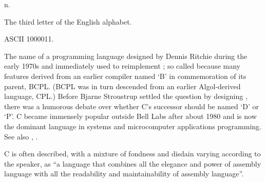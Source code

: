  n.

\begin{inparaenum}
\item The third letter of the English alphabet.
\item ASCII 1000011.
\item The name of a programming language designed by Dennis Ritchie during the
    early 1970s and immediately used to reimplement ; so called
    because many features derived from an earlier compiler named `B' in
    commemoration of its parent, BCPL. (BCPL was in turn descended from an
    earlier Algol-derived language, CPL.) Before Bjarne Stroustrup settled the
    question by designing , there was a humorous debate over
    whether C's successor should be named `D' or `P'. C became immensely popular
    outside Bell Labs after about 1980 and is now the dominant language in
    systems and microcomputer applications programming. See also
    , .
\end{inparaenum}

C is often described, with a mixture of fondness and disdain varying according
to the speaker, as ``a language that combines all the elegance and power of
assembly language with all the readability and maintainability of assembly
language''.

